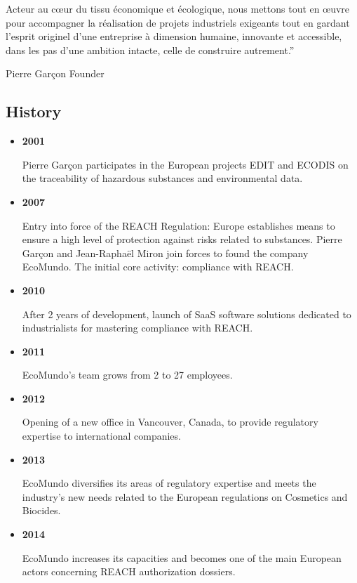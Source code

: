 \documentclass[a4paper,12pt,twoside]{report}
\begin{document}
Acteur au cœur du tissu économique et écologique, nous mettons tout en œuvre pour accompagner la réalisation de projets industriels exigeants tout en gardant l’esprit originel d’une entreprise à dimension humaine, innovante et accessible, dans les pas d’une ambition intacte, celle de construire autrement.”


Pierre Garçon
Founder

\subsection{History}
\begin{itemize}
\item \textbf{2001}

Pierre Garçon participates in the European projects EDIT and ECODIS on the traceability of hazardous substances and environmental data.

\item \textbf{2007}

Entry into force of the REACH Regulation: Europe establishes means to ensure a high level of protection against risks related to substances. Pierre Garçon and Jean-Raphaël Miron join forces to found the company EcoMundo. The initial core activity: compliance with REACH.

\item \textbf{2010}

After 2 years of development, launch of SaaS software solutions dedicated to industrialists for mastering compliance with REACH.

\item \textbf{2011}

EcoMundo's team grows from 2 to 27 employees.

\item \textbf{2012}

Opening of a new office in Vancouver, Canada, to provide regulatory expertise to international companies.

\item \textbf{2013}

EcoMundo diversifies its areas of regulatory expertise and meets the industry's new needs related to the European regulations on Cosmetics and Biocides.

\item \textbf{2014}

EcoMundo increases its capacities and becomes one of the main European actors concerning REACH authorization dossiers.


\end{itemize}
\end{document}
